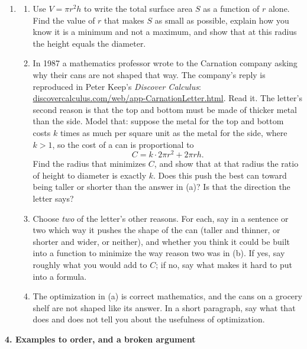 \documentclass[11pt]{article}
\newcommand{\prob}[1]{\medskip\noindent\textbf{\large #1}\par\smallskip}
\begin{document}
\begin{enumerate}[resume]
\item[]
\begin{enumerate}
\item Use $V=\pi r^2h$ to write the total surface area $S$ as a function of $r$ alone.
Find the value of $r$ that makes $S$ as small as possible, explain how you know it is a
minimum and not a maximum, and show that at this radius the height equals the diameter.

\item In 1987 a mathematics professor wrote to the Carnation company asking why their
cans are not shaped that way. The company's reply is reproduced in Peter Keep's
\emph{Discover Calculus}:
\href{https://www.discovercalculus.com/web/app-CarnationLetter.html}{discovercalculus.com/web/app-CarnationLetter.html}.
Read it. The letter's second reason is that the top and bottom must be made of thicker
metal than the side. Model that: suppose the metal for the top and bottom costs $k$
times as much per square unit as the metal for the side, where $k>1$, so the cost of a
can is proportional to
\[
C = k\cdot 2\pi r^2 + 2\pi r h .
\]
Find the radius that minimizes $C$, and show that at that radius the ratio of height to
diameter is exactly $k$. Does this push the best can toward being taller or shorter than
the answer in (a)? Is that the direction the letter says?

\item Choose \emph{two} of the letter's other reasons. For each, say in a sentence or two
which way it pushes the shape of the can (taller and thinner, or shorter and wider, or
neither), and whether you think it could be built into a function to minimize the way
reason two was in (b). If yes, say roughly what you would add to $C$; if no, say what makes
it hard to put into a formula.

\item The optimization in (a) is correct mathematics, and the cans on a grocery shelf are
not shaped like its answer. In a short paragraph, say what that does and does not tell
you about the usefulness of optimization.
\end{enumerate}
\end{enumerate}

\newpage
\prob{4. Examples to order, and a broken argument}
\end{document}

